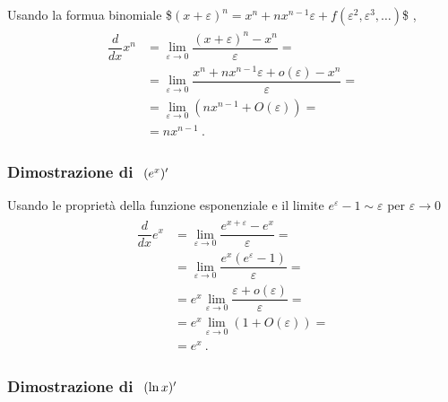 \documentclass[letterpaper,10pt,english]{jupyterBook}
\begin{document}
\sphinxAtStartPar
Usando la formua binomiale \$\((x + \varepsilon)^n = x^n + n x^{n-1} \varepsilon + f(\varepsilon^2, \varepsilon^3, \dots)\)\$  ,
\begin{equation*}
\begin{split}\begin{aligned}
  \dfrac{d}{dx} x^n
  & = \lim_{\varepsilon \rightarrow 0}  \dfrac{(x+\varepsilon)^{n} - x^n}{\varepsilon} = \\
  & = \lim_{\varepsilon \rightarrow 0}  \dfrac{x^n + n x^{n-1} \varepsilon + o(\varepsilon) - x^n}{\varepsilon} = \\
  & = \lim_{\varepsilon \rightarrow 0}  \left( n x^{n-1} + O(\varepsilon) \right) = \\
  & = n x^{n-1} \ .
\end{aligned}\end{split}
\end{equation*}\subsubsection*{Dimostrazione di \protect\(\ (e^x)'\protect\)}

\sphinxAtStartPar
Usando le proprietà della funzione esponenziale e il limite \(e^{\varepsilon} - 1 \sim \varepsilon\) per \(\varepsilon \rightarrow 0\)
\begin{equation*}
\begin{split}\begin{aligned}
  \dfrac{d}{dx} e^x       
  & = \lim_{\varepsilon \rightarrow 0}  \dfrac{e^{x+\varepsilon} - e^x}{\varepsilon} = \\
  & = \lim_{\varepsilon \rightarrow 0}  \dfrac{e^x \left( e^{\varepsilon} - 1 \right)}{\varepsilon} = \\
  & = e^x \lim_{\varepsilon \rightarrow 0}  \dfrac{\varepsilon + o(\varepsilon)}{\varepsilon} = \\
  & = e^x \lim_{\varepsilon \rightarrow 0}  \left( 1 + O(\varepsilon) \right) = \\
  & = e^x \ .
\end{aligned}\end{split}
\end{equation*}\subsubsection*{Dimostrazione di \protect\(\ (\ln x)'\protect\)}
\end{document}

